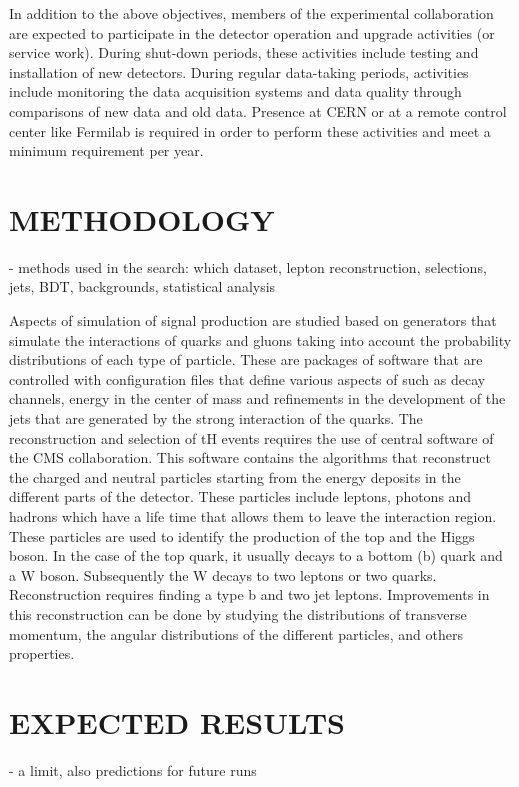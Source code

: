 \documentclass[final,3p]{CSP}
\begin{document}
In addition to the above objectives, members of the experimental collaboration are expected to participate in the detector operation and upgrade activities (or service work).
During shut-down periods, these activities include testing and installation of new detectors.
During regular data-taking periods, activities include monitoring the data acquisition systems and data quality through comparisons of new data and old data.
Presence at CERN or at a remote control center like Fermilab is required in order to perform these activities and meet a minimum requirement per year. 


\section{METHODOLOGY}
- methods used in the search: which dataset,  lepton reconstruction, selections, jets, BDT, backgrounds, statistical analysis

Aspects of simulation of signal production are studied based on generators that simulate the 
interactions of quarks and gluons taking into account the probability distributions of each 
type of particle. These are packages of software that are controlled with configuration files 
that define various aspects of such as decay channels, energy in the center of mass and 
refinements in the development of the jets that are generated by the strong interaction of 
the quarks. The reconstruction and selection of tH events requires the use of central 
software of the CMS collaboration. This software contains the algorithms that reconstruct the 
charged and neutral particles starting from the energy deposits in the different parts of the 
detector. These particles include leptons, photons and hadrons which have a life time that 
allows them to leave the interaction region. These particles are used to identify the 
production of the top and the Higgs boson. In the case of the top quark, it usually decays to 
a bottom (b) quark and a W boson. Subsequently the W decays to two leptons or two quarks. 
Reconstruction requires finding a type b and two jet leptons. Improvements in this 
reconstruction can be done by studying the distributions of transverse momentum, the angular 
distributions of the different particles, and others properties.

\section{EXPECTED RESULTS}
- a limit, also predictions for future runs
\end{document}
